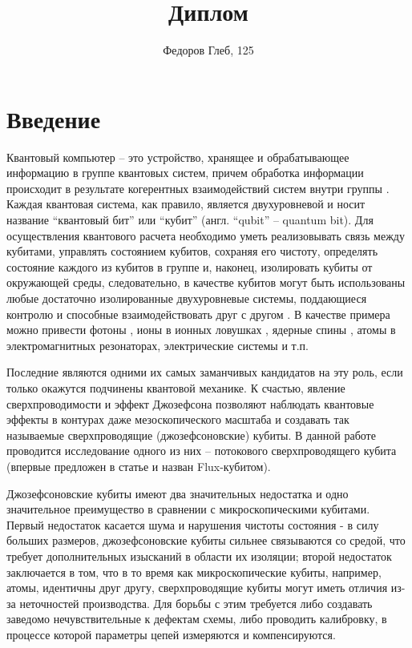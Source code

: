 \documentclass[12pt]{article}
\author{Федоров Глеб, 125}
\title{Диплом}
\numberwithin{equation}{section}
\begin{document}
\maketitle
\tableofcontents
\newpage
\part*{Введение}
Квантовый компьютер -- это устройство, хранящее и обрабатывающее информацию в группе квантовых систем, причем обработка информации происходит в результате когерентных взаимодействий систем внутри группы \cite{Lloyd1993}. Каждая квантовая система, как правило, является двухуровневой и носит название ``квантовый бит'' или ``кубит'' (англ. ``qubit'' -- quantum bit). Для осуществления квантового расчета необходимо уметь реализовывать связь между кубитами, управлять состоянием кубитов, сохраняя его чистоту, определять состояние каждого из кубитов в группе и, наконец, изолировать кубиты от окружающей среды, следовательно, в качестве кубитов могут быть использованы любые достаточно изолированные двухуровневые системы, поддающиеся контролю и способные взаимодействовать друг с другом \cite{DiVincenzo1995, DiVincenzo2000, Spiller1996}. В качестве примера можно привести фотоны \cite{Milburn2009}, ионы в ионных ловушках \cite{Cirac1995}, ядерные спины \cite{Kane1998}, атомы в электромагнитных резонаторах\cite{Rempe2008},  электрические системы\cite{Devoret2005} и т.п.

Последние являются одними их самых заманчивых кандидатов на эту роль, если только окажутся подчинены квантовой механике\cite{Devoret1995}. К счастью, явление сверхпроводимости и эффект Джозефсона позволяют наблюдать квантовые эффекты в контурах даже мезоскопического масштаба и создавать так называемые сверхпроводящие (джозефсоновские) кубиты\cite{Clarke2008}. В данной работе проводится исследование одного из них -- потокового сверхпроводящего кубита (впервые предложен в статье\cite{Orlando1999} и назван Flux-кубитом).

Джозефсоновские кубиты имеют два значительных недостатка и одно значительное преимущество в сравнении с микроскопическими кубитами. Первый недостаток касается шума и нарушения чистоты состояния - в силу больших размеров, джозефсоновские кубиты сильнее связываются со средой, что требует дополнительных изысканий в области их изоляции; второй недостаток заключается в том, что в то время как микроскопические кубиты, например, атомы, идентичны друг другу, сверхпроводящие кубиты могут иметь отличия из-за неточностей производства. Для борьбы с этим требуется либо создавать заведомо нечувствительные к дефектам схемы, либо проводить калибровку, в процессе которой параметры цепей измеряются и компенсируются.
\end{document}
